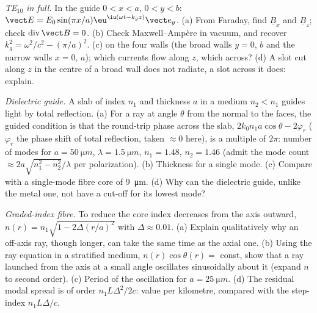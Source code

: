 \begin{exercise}[$\star\star\star$]\label{exo:b2:guided-waves:10}
\emph{TE$_{10}$ in full.} In the guide $0 < x < a$, $0 < y < b$: $\vect E =
E_0\sin(\pi x/a)\eu^{\iu(\omega t - k_gz)}\vect e_y$. (a) From Faraday, find $\underline B_x$
and $\underline B_z$; check $\operatorname{div}\vect B = 0$. (b) Check Maxwell--Ampère
in vacuum, and recover $k_g^2 = \omega^2/c^2 - (\pi/a)^2$. (c) 
on the four walls (the broad walls $y = 0$, $b$ and the narrow walls $x = 0$,
$a$); which currents flow along $z$, which across? (d) A slot cut along
$z$ in the centre of a broad wall does not radiate, a slot across it
does: explain.
\end{exercise}

\begin{exercise}[$\star\star\star$]\label{exo:b2:guided-waves:11}
\emph{Dielectric guide.} A slab of index $n_1$ and thickness $a$ in a
medium $n_2 < n_1$ guides light by total reflection. (a) For a ray at
angle $\theta$ from the normal to the faces, the guided condition is that
the round-trip phase across the slab, $2k_0n_1a\cos\theta - 2\varphi_r$ ($\varphi_r$
the phase shift of total reflection, taken $\approx 0$ here), is a multiple
of $2\pi$: number of modes for $a = \qty{50}{\micro m}$, $\lambda = \qty{1.5}{\micro m}$,
$n_1 = 1.48$, $n_2 = 1.46$ (admit the mode count $\approx 2a\sqrt{n_1^2 - n_2^2}/\lambda$
per polarization). (b) Thickness for a single mode. (c) Compare with a
single-mode fibre core of \qty{9}{\micro m}. (d) Why can the dielectric
guide, unlike the metal one, not have a cut-off for its lowest mode?
\end{exercise}

\begin{exercise}[$\star\star\star$]\label{exo:b2:guided-waves:12}
\emph{Graded-index fibre.} To reduce  the core index
decreases from the axis outward, $n(r) = n_1\sqrt{1 - 2\Delta(r/a)^2}$ with
$\Delta \approx 0.01$. (a) Explain qualitatively why an off-axis ray, though
longer, can take the same time as the axial one. (b) Using the ray
equation in a stratified medium, $n(r)\cos\theta(r) = $ const, show that
a ray launched from the axis at a small angle oscillates sinusoidally
about it (expand $n$ to second order). (c) Period of the oscillation
for $a = \qty{25}{\micro m}$. (d) The residual modal spread is of order
$n_1L\Delta^2/2c$: value per kilometre, compared with the step-index
$n_1L\Delta/c$.
\end{exercise}

